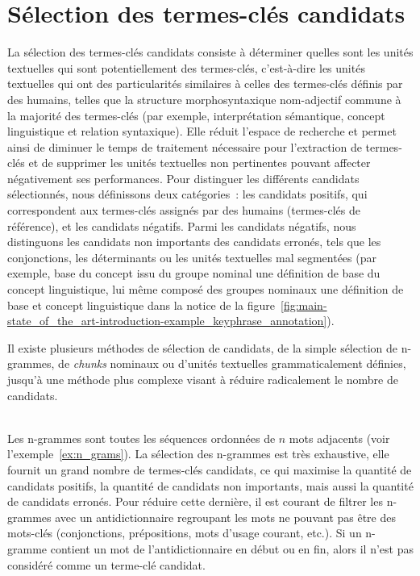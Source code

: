 
  \section{Sélection des termes-clés candidats}
  \label{sec:main-state_of_the_art-keyphrase_candidate_selection}
    La sélection des termes-clés candidats consiste à déterminer quelles sont
    les unités textuelles qui sont potentiellement des termes-clés, c'est-à-dire
    les unités textuelles qui ont des particularités similaires à celles des
    termes-clés définis par des humains, telles que la structure
    morphosyntaxique nom-adjectif commune à la majorité des termes-clés
    (par exemple, \og{}interprétation sémantique\fg{}, \og{}concept
    linguistique\fg{} et
    \og{}relation syntaxique\fg{}). Elle réduit l'espace de recherche et permet
    ainsi de diminuer le temps de traitement nécessaire pour l'extraction de
    termes-clés et de supprimer les
    unités textuelles non pertinentes pouvant affecter négativement ses
    performances. Pour distinguer les différents candidats sélectionnés, nous
    définissons deux catégories~: les candidats positifs, qui
    correspondent aux termes-clés assignés par des humains (termes-clés de
    référence), et les candidats négatifs. Parmi les candidats négatifs,
    nous distinguons les candidats non importants des candidats erronés, tels que les conjonctions, les
    déterminants ou les unités textuelles mal segmentées (par exemple,
    \og{}base du concept\fg{} issu du groupe nominal \og{}une définition de base
    du concept linguistique\fg{}, lui même composé des groupes nominaux
    \og{}une définition de base\fg{} et \og{}concept linguistique\fg{} dans la
    notice de la
    figure~\ref{fig:main-state_of_the_art-introduction-example_keyphrase_annotation}).

    Il existe plusieurs méthodes de sélection de candidats, de la simple
    sélection de n-grammes, de \textit{chunks} nominaux ou d'unités textuelles
    grammaticalement définies, jusqu'à une méthode plus complexe visant à
    réduire radicalement le nombre de candidats.

    ~\\Les n-grammes sont
    toutes les séquences ordonnées de $n$ mots adjacents (voir
    l'exemple~\ref{ex:n_grams}). La sélection des n-grammes est très exhaustive,
    elle fournit un grand nombre de termes-clés candidats, ce qui maximise la
    quantité de candidats positifs, la quantité de candidats non importants,
    mais aussi la quantité de candidats erronés. Pour réduire cette dernière, il
    est courant de filtrer les n-grammes avec un
    antidictionnaire regroupant les mots ne pouvant pas être des
    mots-clés (conjonctions, prépositions, mots d'usage courant, etc.). Si un
    n-gramme contient un mot de l'antidictionnaire en début ou en fin, alors il
    n'est pas considéré comme un terme-clé candidat.
    
